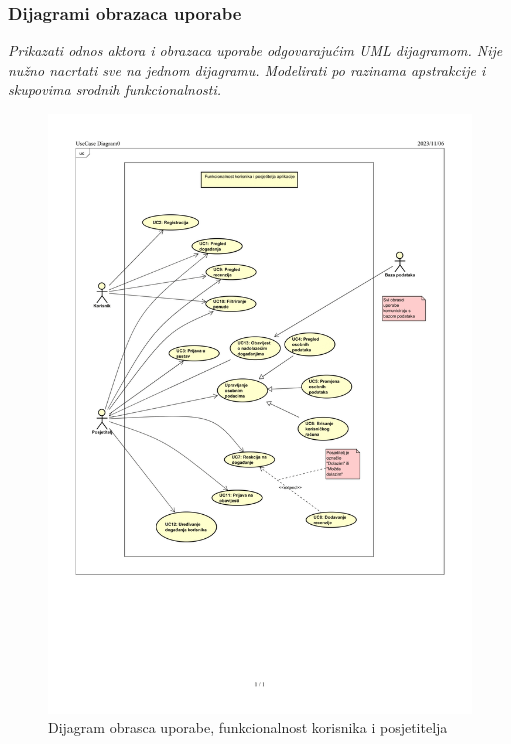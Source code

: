 					
					
				\eject	
				
					
				\subsubsection{Dijagrami obrazaca uporabe}
					
					\textit{Prikazati odnos aktora i obrazaca uporabe odgovarajućim UML dijagramom. Nije nužno nacrtati sve na jednom dijagramu. Modelirati po razinama apstrakcije i skupovima srodnih funkcionalnosti.}
					
					\begin{figure}[H]
						\includegraphics[scale=0.6]{slike/UC_dijagram1-1.PNG} %
						\centering
						\caption{Dijagram obrasca uporabe, funkcionalnost korisnika i posjetitelja}
						\label{fig:promjene}
					\end{figure}
		
